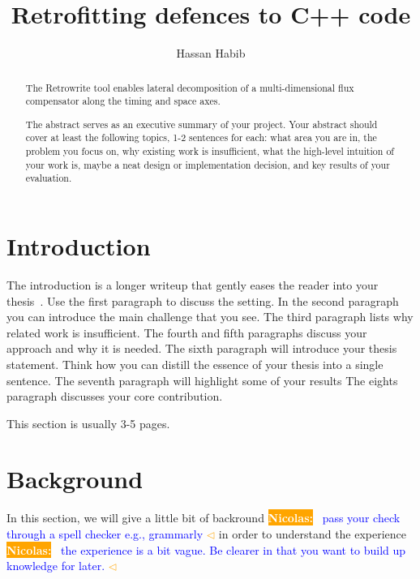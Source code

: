 \documentclass[a4paper,11pt,oneside]{report}
\title{Retrofitting defences to C++ code}
\author{Hassan Habib}
\newcommand{\sysname}{Retrowrite\xspace}
\newcommand{\todobox}[3]{%
	\colorbox{#1}{\textcolor{white}{\sffamily\bfseries\scriptsize #2}}%
	~\textcolor{blue}{#3} %
	\textcolor{#1}{$\triangleleft$}%
}
\newcommand{\nb}[1]{\todobox{orange}{Nicolas:}{#1}}
\begin{document}
\maketitle

\begin{abstract}
    The \sysname tool enables lateral decomposition of a multi-dimensional
    flux compensator along the timing and space axes.

    The abstract serves as an executive summary of your project.
    Your abstract should cover at least the following topics, 1-2 sentences for
    each: what area you are in, the problem you focus on, why existing work is
    insufficient, what the high-level intuition of your work is, maybe a neat
    design or implementation decision, and key results of your evaluation.

\end{abstract}


\maketoc

\chapter{Introduction}

The introduction is a longer writeup that gently eases the reader into your
thesis~\cite{dinesh20oakland}. Use the first paragraph to discuss the setting.
In the second paragraph you can introduce the main challenge that you see.
The third paragraph lists why related work is insufficient.
The fourth and fifth paragraphs discuss your approach and why it is needed.
The sixth paragraph will introduce your thesis statement. Think how you can
distill the essence of your thesis into a single sentence.
The seventh paragraph will highlight some of your results
The eights paragraph discusses your core contribution.

This section is usually 3-5 pages.

\chapter{Background}
In this section, we will give a little bit of backround \nb{pass your check
through a spell checker e.g., grammarly} in order to understand
the experience \nb{the experience is a bit vague. Be clearer in that you want to
build up knowledge for later.}
\end{document}
